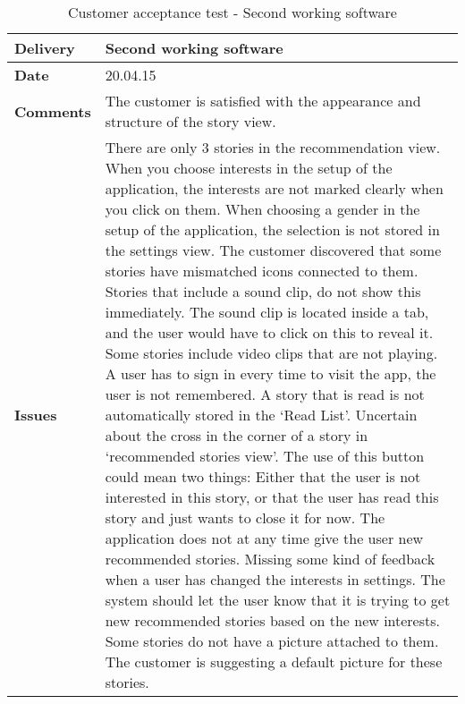 \renewcommand{\arraystretch}{2}%
\begin{center}
	\small
	\begin{longtable}{ | p{4cm} | p{13cm} | }
		
		\caption[Customer acceptance test - Second working software]{Customer acceptance test - Second working software} \label{Tab:cattest4}\\
		\hline
		\textbf{Delivery} & Second working software\\ \hline
		\textbf{Date} & 20.04.15\\ \hline
		\textbf{Comments} & The customer is satisfied with the appearance and structure of the story view. 
		\\ \hline
		\textbf{Issues} & 
		There are only 3 stories in the recommendation view. When you choose interests in the setup of the application, the interests are not marked clearly when you click on them. When choosing a gender in the setup of the application, the selection is not stored in the settings view. The customer discovered that some stories have mismatched icons connected to them. Stories that include a sound clip, do not show this immediately. The sound clip is located inside a tab, and the user would have to click on this to reveal it. Some stories include video clips that are not playing. A user has to sign in every time to visit the app, the user is not remembered. A story that is read is not automatically stored in the ‘Read List’. Uncertain about the cross in the corner of a story in ‘recommended stories view’. The use of this button could mean two things: Either that the user is not interested in this story, or that the user has read this story and just wants to close it for now. The application does not at any time give the user new recommended stories. Missing some kind of feedback when a user has changed the interests in settings. The system should let the user know that it is trying to get new recommended stories based on the new interests. Some stories do not have a picture attached to them. The customer is suggesting a default picture for these stories.
		\\ \hline 	
	\end{longtable}
\end{center}

